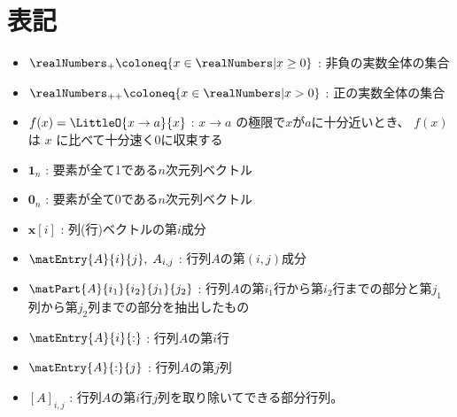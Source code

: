 \chapter{表記}
    \begin{itemize}
        \item $\realNumbers_+ \coloneq \{x\in\realNumbers|x\geq 0\}$ : 非負の実数全体の集合
        \item $\realNumbers_{++} \coloneq \{x\in\realNumbers|x > 0\}$ : 正の実数全体の集合
        \item $f(x) = \LittleO{x\to a}{x}$ : $x\to a$ の極限で$x$が$a$に十分近いとき、 $f(x)$ は $x$ に比べて十分速く0に収束する
        \item $\bm{1}_n$ : 要素が全て1である$n$次元列ベクトル
        \item $\bm{0}_n$ : 要素が全て0である$n$次元列ベクトル
        \item $\bm{x}[i]$ : 列(行)ベクトルの第$i$成分
        \item $\matEntry{A}{i}{j},\;A_{i,j}$ : 行列$A$の第$(i,j)$成分
        \item $\matPart{A}{i_1}{i_2}{j_1}{j_2}$ : 行列$A$の第$i_1$行から第$i_2$行までの部分と第$j_1$列から第$j_2$列までの部分を抽出したもの
        \item $\matEntry{A}{i}{:}$ : 行列$A$の第$i$行
        \item $\matEntry{A}{:}{j}$ : 行列$A$の第$j$列
        \item $[A]_{i,j}$ : 行列$A$の第$i$行$j$列を取り除いてできる部分行列。
    \end{itemize}
